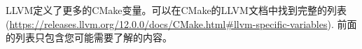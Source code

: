 LLVM定义了更多的CMake变量。可以在CMake的LLVM文档中找到完整的列表 (\url{https://releases.llvm.org/12.0.0/docs/CMake.html\#llvm-specific-variables}). 前面的列表只包含您可能需要了解的内容。\par












































